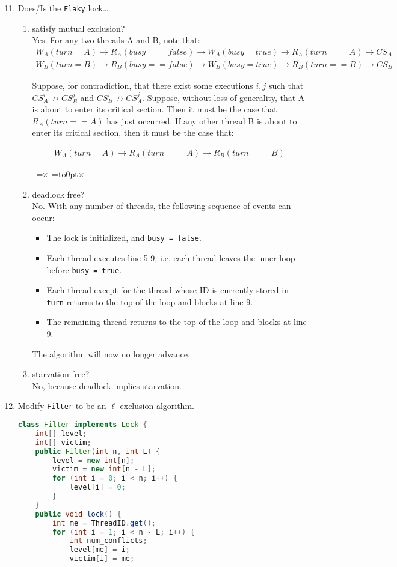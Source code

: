 \documentclass{article}
\newcommand{\contradiction}{{\hbox{%
    \setbox0=\hbox{$\mkern-3mu\times\mkern-3mu$}%
    \setbox1=\hbox to0pt{\hss$\times$\hss}%
    \copy0\raisebox{0.5\wd0}{\copy1}\raisebox{-0.5\wd0}{\box1}\box0
}}}
\newcommand{\num}[1]{\setcounter{enumi}{#1}}
\begin{document}
\begin{enumerate}
\num{10}
\item Does/Is the \texttt{Flaky} lock\dots 
\begin{enumerate}
\item satisfy mutual exclusion?\\
Yes. For any two threads A and B, note that:
\begin{align*}
W_A(turn=A) \rightarrow R_A(busy==false) \rightarrow W_A(busy = true) \rightarrow R_A(turn == A) \rightarrow CS_A \\
W_B(turn=B) \rightarrow R_B(busy==false) \rightarrow W_B(busy = true) \rightarrow R_B(turn == B) \rightarrow CS_B
\end{align*}

Suppose, for contradiction, that there exist some executions $i, j$
such that $CS^i_A \not \rightarrow CS^j_B$ and $CS^i_B \not\rightarrow CS^j_A$. Suppose,
without loss of generality, that A is about to enter its critical
section. Then it must be the case that $R_A(turn == A)$ has just
occurred. If any other thread B is about to enter its critical section,
then it must be the case that:

\begin{align*}
W_A(turn=A) \rightarrow R_A(turn == A) \rightarrow R_B(turn == B)
\end{align*}

\contradiction
\item deadlock free?\\
No. With any number of threads, the following sequence of events can
occur:
\begin{itemize}
\item The lock is initialized, and \texttt{busy = false}.
\item Each thread executes line 5-9, i.e. each thread leaves the inner
  loop before \texttt{busy = true}.
\item Each thread except for the thread whose ID is currently stored
  in \texttt{turn} returns to the top of the loop and blocks at line 9.
\item The remaining thread returns to the top of the loop and blocks
  at line 9.
\end{itemize}

The algorithm will now no longer advance.
\item starvation free?\\
No, because deadlock implies starvation.

\end{enumerate}

\num{13}
\item Modify \texttt{Filter} to be an $\ell$-exclusion algorithm.
\begin{lstlisting}[language=Java]
class Filter implements Lock {
	int[] level;
	int[] victim;
	public Filter(int n, int L) {
		level = new int[n];
		victim = new int[n - L];
		for (int i = 0; i < n; i++) {
			level[i] = 0;
		}
	}
	public void lock() {
		int me = ThreadID.get();
		for (int i = 1; i < n - L; i++) { 
			int num_conflicts;
			level[me] = i;
			victim[i] = me;


\end{lstlisting}
\end{enumerate}
\end{document}
